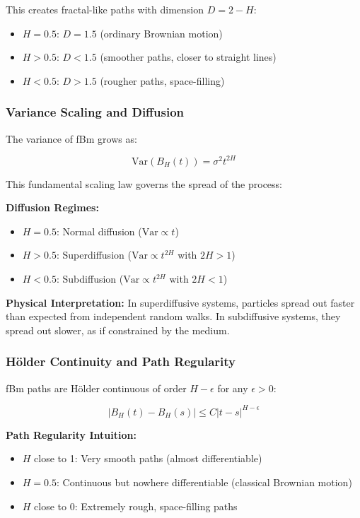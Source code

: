 \documentclass[11pt,a4paper]{article}
\begin{document}
This creates fractal-like paths with dimension $D = 2 - H$:
\begin{itemize}
    \item $H = 0.5$: $D = 1.5$ (ordinary Brownian motion)
    \item $H > 0.5$: $D < 1.5$ (smoother paths, closer to straight lines)
    \item $H < 0.5$: $D > 1.5$ (rougher paths, space-filling)
\end{itemize}

\subsubsection{Variance Scaling and Diffusion}

The variance of fBm grows as:

\begin{equation}
\text{Var}(B_H(t)) = \sigma^2 t^{2H}
\end{equation}

This fundamental scaling law governs the spread of the process:

\textbf{Diffusion Regimes:}
\begin{itemize}
    \item $H = 0.5$: Normal diffusion ($\text{Var} \propto t$)
    \item $H > 0.5$: Superdiffusion ($\text{Var} \propto t^{2H}$ with $2H > 1$)
    \item $H < 0.5$: Subdiffusion ($\text{Var} \propto t^{2H}$ with $2H < 1$)
\end{itemize}

\textbf{Physical Interpretation:} In superdiffusive systems, particles spread out faster than expected from independent random walks. In subdiffusive systems, they spread out slower, as if constrained by the medium.

\subsubsection{Hölder Continuity and Path Regularity}

fBm paths are Hölder continuous of order $H - \epsilon$ for any $\epsilon > 0$:

\begin{equation}
|B_H(t) - B_H(s)| \leq C |t - s|^{H - \epsilon}
\end{equation}

\textbf{Path Regularity Intuition:}
\begin{itemize}
    \item $H$ close to 1: Very smooth paths (almost differentiable)
    \item $H = 0.5$: Continuous but nowhere differentiable (classical Brownian motion)
    \item $H$ close to 0: Extremely rough, space-filling paths
\end{itemize}
\end{document}

